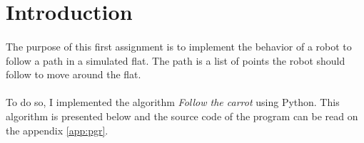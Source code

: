 \section*{Introduction}

\paragraph{}{
    The purpose of this first assignment is to implement the behavior
of a robot to follow a path in a simulated flat. The path is a list of points
the robot should follow to move around the flat.
}

\paragraph{}{
    To do so, I implemented the algorithm \textit{Follow the carrot} using
 Python. This algorithm is presented below and the source code of the program 
 can be read on the appendix \ref{app:pgr}.
}
